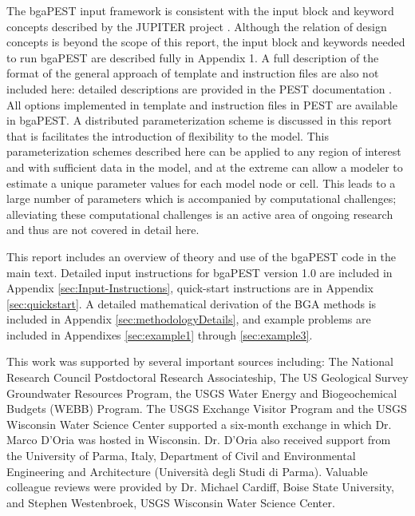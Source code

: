 \documentclass[11pt,oneside,onecolumn]{usgsreport}
\begin{document}
\begin{multicols}{2}
The bgaPEST input framework is consistent with the input block and
keyword concepts described by the JUPITER project \citet{BantaEtAl2006}.
Although the relation of design concepts is beyond the scope of this
report, the input block and keywords needed to run bgaPEST are described
fully in Appendix 1. A full description of the format of the general
approach of template and instruction files are also not included here:
detailed descriptions are provided in the PEST documentation \citep[chapter 3]{PEST}.
All options implemented in template and instruction files in PEST
are available in bgaPEST. A distributed parameterization scheme is
discussed in this report that is facilitates the introduction of 
flexibility to the model. This parameterization schemes described
here can be applied to any region of interest and with sufficient
data in the model, and at the extreme can allow a modeler to estimate
a unique parameter values for each model node or cell. This leads
to a large number of parameters which is accompanied by computational
challenges; alleviating these computational challenges is an active
area of ongoing research and thus are not covered in detail here.

This report includes an overview of theory and use of the bgaPEST
code in the main text. Detailed input instructions for bgaPEST version
1.0 are included in Appendix \ref{sec:Input-Instructions}, quick-start instructions are in Appendix
\ref{sec:quickstart}. A detailed mathematical derivation of the BGA methods is included
in Appendix \ref{sec:methodologyDetails}, and example problems are included in Appendixes \ref{sec:example1} through \ref{sec:example3}. 



This work was supported by several important sources including: The
National Research Council Postdoctoral Research Associateship, The
US Geological Survey Groundwater Resources Program, the USGS Water
Energy and Biogeochemical Budgets (WEBB) Program. The USGS Exchange
Visitor Program and the USGS Wisconsin Water Science Center supported
a six-month exchange in which Dr. Marco D'Oria was hosted in Wisconsin.
Dr. D'Oria also received support from the University of Parma, Italy,
Department of Civil and Environmental Engineering and Architecture (Universit\`{a} degli Studi di Parma).
Valuable colleague reviews were provided by Dr. Michael Cardiff, Boise
State University, and Stephen Westenbroek, USGS Wisconsin Water Science
Center. 


\end{multicols}
\end{document}
